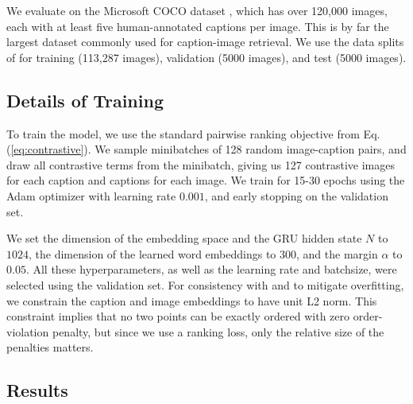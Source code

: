 \documentclass{article} \usepackage{iclr2016_conference,times}
\begin{document}
We evaluate on the Microsoft COCO dataset \citep{coco}, which has over 120,000 images, each with at least five human-annotated captions per image. This is by far the largest dataset commonly used for caption-image retrieval. We use the data splits of \citet{karpathydeep} for training (113,287 images), validation (5000 images), and test (5000 images).

\subsection{Details of Training}


To train the model, we use the standard pairwise ranking objective from Eq.  (\ref{eq:contrastive}). We sample minibatches of 128 random image-caption pairs, and draw all contrastive terms from the minibatch, giving us 127 contrastive images for each caption and captions for each image. We train for 15-30 epochs using the Adam optimizer with learning rate $0.001$, and early stopping on the validation set.

We set the dimension of the embedding space and the GRU hidden state $N$ to $1024$, the dimension of the learned word embeddings to $300$,  and the margin $\alpha$ to $0.05$. All these hyperparameters, as well as the learning rate and batchsize, were selected using the validation set. For consistency with \citet{kiros2014} and to mitigate overfitting, we constrain the caption and image embeddings to have unit L2 norm. This constraint implies that no two points can be exactly ordered with zero order-violation penalty, but since we use a ranking loss, only the relative size of the penalties matters.

\subsection{Results}
\end{document}
